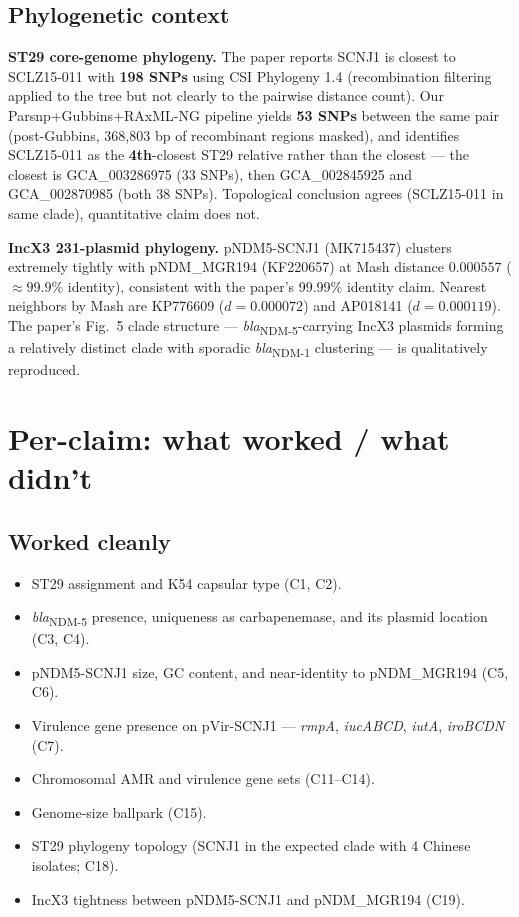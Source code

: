 \documentclass[11pt,letterpaper]{article}
\begin{document}
\subsection{Phylogenetic context}

\textbf{ST29 core-genome phylogeny.} The paper reports SCNJ1 is closest to SCLZ15-011 with \textbf{198 SNPs} using CSI Phylogeny 1.4 (recombination filtering applied to the tree but not clearly to the pairwise distance count). Our Parsnp+Gubbins+RAxML-NG pipeline yields \textbf{53 SNPs} between the same pair (post-Gubbins, 368{,}803 bp of recombinant regions masked), and identifies SCLZ15-011 as the \textbf{4th}-closest ST29 relative rather than the closest --- the closest is GCA\_003286975 (33 SNPs), then GCA\_002845925 and GCA\_002870985 (both 38 SNPs). Topological conclusion agrees (SCLZ15-011 in same clade), quantitative claim does not.

\textbf{IncX3 231-plasmid phylogeny.} pNDM5-SCNJ1 (MK715437) clusters extremely tightly with pNDM\_MGR194 (KF220657) at Mash distance $0.000557$ ($\approx 99.9\%$ identity), consistent with the paper's 99.99\% identity claim. Nearest neighbors by Mash are KP776609 ($d=0.000072$) and AP018141 ($d=0.000119$). The paper's Fig.~5 clade structure --- \textit{bla}\textsubscript{NDM-5}-carrying IncX3 plasmids forming a relatively distinct clade with sporadic \textit{bla}\textsubscript{NDM-1} clustering --- is qualitatively reproduced.

\section{Per-claim: what worked / what didn't}

\subsection{Worked cleanly}

\begin{itemize}[nosep]
\item ST29 assignment and K54 capsular type (C1, C2).
\item \textit{bla}\textsubscript{NDM-5} presence, uniqueness as carbapenemase, and its plasmid location (C3, C4).
\item pNDM5-SCNJ1 size, GC content, and near-identity to pNDM\_MGR194 (C5, C6).
\item Virulence gene presence on pVir-SCNJ1 --- \textit{rmpA}, \textit{iucABCD}, \textit{iutA}, \textit{iroBCDN} (C7).
\item Chromosomal AMR and virulence gene sets (C11--C14).
\item Genome-size ballpark (C15).
\item ST29 phylogeny topology (SCNJ1 in the expected clade with 4 Chinese isolates; C18).
\item IncX3 tightness between pNDM5-SCNJ1 and pNDM\_MGR194 (C19).
\end{itemize}
\end{document}
